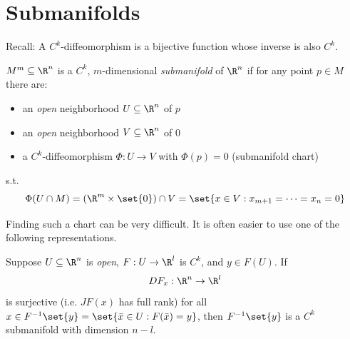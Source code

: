 
\section{Submanifolds}

\textcolor{eGray}{Recall: A $C^k$-diffeomorphism is a bijective function whose inverse is also $C^k$.}

\begin{definition*}
$M^m \subseteq \R^n$ is a $C^k$, $m$-dimensional \emph{submanifold} of $\R^n$ if for any point $p \in M$ there are:
\begin{itemize}
    \item an \emph{open} neighborhood $U \subseteq \R^n$ of $p$
    \item an \emph{open} neighborhood $V \subseteq \R^n$ of $0$
    \item a $C^k$-diffeomorphism $\Phi: U \to V$ with $\Phi(p) = 0$ \textcolor{eGray}{(submanifold chart)}
\end{itemize}
s.t.
\[ \Phi(U \cap M) = (\R^m \times \set{0}) \cap V = \set{x \in V : x_{m+1} = \dots = x_n = 0} \]
\end{definition*}

\begin{center}
\end{center}

Finding such a chart can be very difficult. It is often easier to use one of the following representations.

\begin{theorem*}
Suppose $U \subseteq \R^n$ is \emph{open}, $F: U \to \R^l$ is $C^k$, and $y \in F(U)$. If
\[ DF_x: \R^n \to \R^l \]
is surjective (i.e. $JF(x)$ has full rank) for all $x \in F^{-1}\set{y} = \set{\bar{x} \in U : F(\bar{x}) = y}$, then $F^{-1}\set{y}$ is a $C^k$ submanifold with dimension $n-l$.
\end{theorem*}

